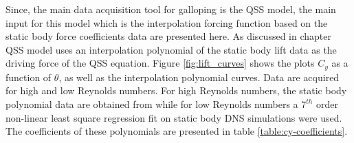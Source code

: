 Since, the main data acquisition tool for galloping is the QSS model, the main input for this model which is the interpolation forcing function based on the static body force coefficients data are presented here. As discussed in chapter \label{sec:QSS_model_methodology} QSS model uses an interpolation polynomial of the static body lift data as the driving force of the QSS equation. Figure \ref{fig:lift_curves} shows the plots $C_y$ as a function of $\theta$, as well as the interpolation polynomial curves. Data are acquired for high and low Reynolds numbers. For high Reynolds numbers, the static body polynomial data are obtained from \cite{Parkinson1964} while for low Reynolds numbers a $7^{th}$ order non-linear least square regression fit on static body DNS simulations were used. The coefficients of these  polynomials are presented in table \ref{table:cy-coefficients}.

